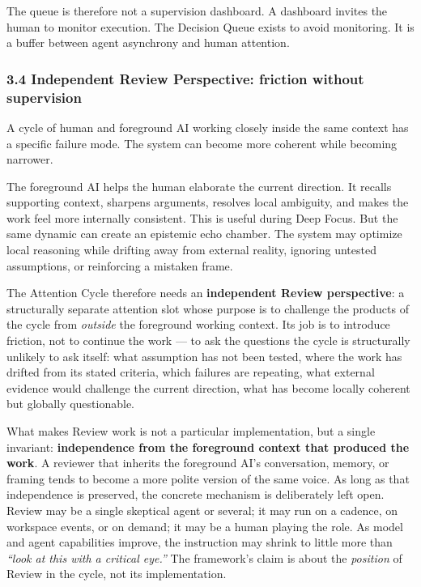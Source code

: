 \documentclass[
  nonatbib,
  preprint]{article}
\begin{document}
The queue is therefore not a supervision dashboard. A dashboard invites
the human to monitor execution. The Decision Queue exists to avoid
monitoring. It is a buffer between agent asynchrony and human attention.

\subsubsection{\texorpdfstring{\textbf{3.4 Independent Review
Perspective: friction without
supervision}}{3.4 Independent Review Perspective: friction without supervision}}\label{independent-review-perspective-friction-without-supervision}

A cycle of human and foreground AI working closely inside the same
context has a specific failure mode. The system can become more coherent
while becoming narrower.

The foreground AI helps the human elaborate the current direction. It
recalls supporting context, sharpens arguments, resolves local
ambiguity, and makes the work feel more internally consistent. This is
useful during Deep Focus. But the same dynamic can create an epistemic
echo chamber. The system may optimize local reasoning while drifting
away from external reality, ignoring untested assumptions, or
reinforcing a mistaken frame.

The Attention Cycle therefore needs an \textbf{independent Review
perspective}: a structurally separate attention slot whose purpose is to
challenge the products of the cycle from \emph{outside} the foreground
working context. Its job is to introduce friction, not to continue the
work --- to ask the questions the cycle is structurally unlikely to ask
itself: what assumption has not been tested, where the work has drifted
from its stated criteria, which failures are repeating, what external
evidence would challenge the current direction, what has become locally
coherent but globally questionable.

What makes Review work is not a particular implementation, but a single
invariant: \textbf{independence from the foreground context that
produced the work}. A reviewer that inherits the foreground AI's
conversation, memory, or framing tends to become a more polite version
of the same voice. As long as that independence is preserved, the
concrete mechanism is deliberately left open. Review may be a single
skeptical agent or several; it may run on a cadence, on workspace
events, or on demand; it may be a human playing the role. As model and
agent capabilities improve, the instruction may shrink to little more
than \emph{``look at this with a critical eye.''} The framework's claim
is about the \emph{position} of Review in the cycle, not its
implementation.
\end{document}
